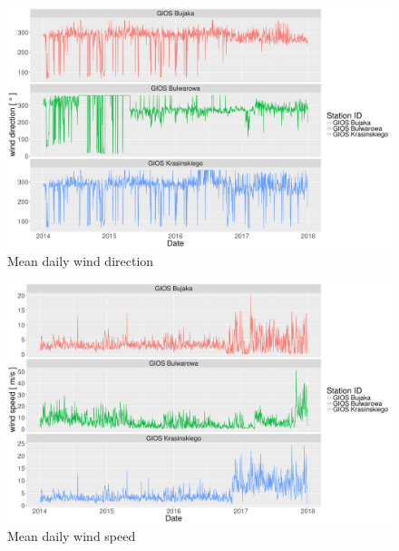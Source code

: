 \begin{landscape}
\begin{figure}[htp]
\centering
  \centering
  \includegraphics[width=\linewidth]{figures/dataset/trend/wind_dir_deg_yearly_trend.png}
  \caption{Mean daily wind direction}
  \label{fig:dataset-trend-wind-dir-ew}
  \end{figure}
\end{landscape}
\begin{landscape}
\begin{figure}[htp]
\centering
  \centering
  \includegraphics[width=\linewidth]{figures/dataset/trend/wind_speed_yearly_trend.png}
  \caption{Mean daily wind speed}
  \label{fig:dataset-trend-wind-speed}
  \end{figure}
\end{landscape}


